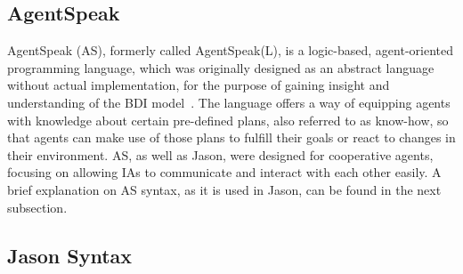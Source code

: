\documentclass[draft,final]{vutinfth} %
\begin{document}
\subsection{AgentSpeak}
\label{chap:as}

AgentSpeak (AS), formerly called AgentSpeak(L), is a logic-based, agent-oriented programming language, which was originally designed as an abstract language without actual implementation, for the purpose of gaining insight and understanding of the BDI model~\cite{rao1996agentspeak}. 
The language offers a way of equipping agents with knowledge about certain pre-defined plans, also referred to as know-how, so that agents can make use of those plans to fulfill their goals or react to changes in their environment. 
AS, as well as Jason, were designed for cooperative agents, focusing on allowing IAs to communicate and interact with each other easily. 
A brief explanation on AS syntax, as it is used in Jason, can be found in the next subsection.

\subsection{Jason Syntax}
\label{chap:syntax}
\end{document}
